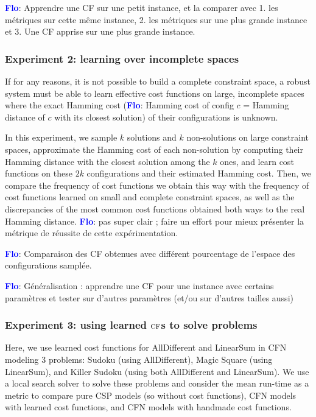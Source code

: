 \documentclass{article}
\newcommand{\csp}{\textsc{CSP}\xspace}
\newcommand{\cfn}{\textsc{CFN}\xspace}
\newcommand{\cf}{\textsc{cf}\xspace}
\newcommand{\flo}{\textcolor{blue}{\bf Flo}\xspace}
\begin{document}
\flo: Apprendre une CF sur une petit instance, et la comparer avec 1. les métriques  sur cette  même instance,  2.  les métriques  sur une  plus grande instance et 3. Une CF apprise sur une plus grande instance.

\subsubsection{Experiment 2: learning over incomplete spaces}

If for any reasons, it is not possible to build a complete constraint space, a robust system must be able to learn effective cost functions on large,  incomplete spaces where the exact Hamming cost  (\flo: Hamming cost of config $c$ =  Hamming distance of $c$ with its closest solution) of their configurations is unknown.

In this experiment,  we sample $k$ solutions and  $k$ non-solutions on large constraint spaces,  approximate the  Hamming cost of each non-solution by computing their  Hamming distance with the closest solution among the $k$ ones, and learn cost functions on these $2k$ configurations and their estimated Hamming cost. Then, we compare the frequency of cost functions we obtain this way with the frequency of cost functions learned on small and complete constraint spaces, as well as the discrepancies of the most common cost functions obtained both ways to the real Hamming distance. \flo: pas super clair ; faire un  effort pour  mieux  présenter  la métrique  de  réussite de  cette expérimentation. 

\flo:  Comparaison  des  CF  obtenues avec  différent  pourcentage  de
l'espace des configurations samplée.

\flo: Généralisation  : apprendre  une CF  pour une  instance avec  certains
paramètres  et  tester sur  d'autres  paramètres  (et/ou sur  d'autres
tailles aussi)

\subsubsection{Experiment 3: using learned $\cf$s to solve problems}

Here, we use learned cost functions for AllDifferent and LinearSum in \cfn modeling  3 problems:  Sudoku (using AllDifferent),  Magic Square (using  LinearSum), and Killer  Sudoku  (using both AllDifferent and LinearSum). We use a local search solver to solve these problems and consider the mean run-time as a metric to compare pure \csp models (so without cost functions),  \cfn models with learned cost functions, and \cfn models with handmade cost functions.
\end{document}
